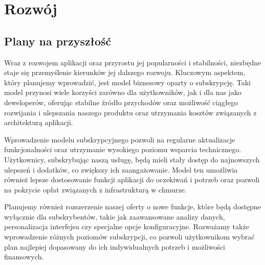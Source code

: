\section{Rozwój}

\subsection{Plany na przyszłość}
Wraz z rozwojem aplikacji oraz przyrostu jej popularności i stabilności, niezbędne staje się przemyślenie kierunków jej dalszego rozwoju. Kluczowym aspektem, który planujemy wprowadzić, jest model biznesowy oparty o subskrypcję. Taki model przynosi wiele korzyści zarówno dla użytkowników, jak i dla nas jako deweloperów, oferując stabilne źródło przychodów oraz możliwość ciągłego rozwijania i ulepszania naszego produktu oraz utrzymania kosztów związanych z architekturą aplikacji.

Wprowadzenie modelu subskrypcyjnego pozwoli na regularne aktualizacje funkcjonalności oraz utrzymanie wysokiego poziomu wsparcia technicznego. Użytkownicy, subskrybując naszą usługę, będą mieli stały dostęp do najnowszych ulepszeń i dodatków, co zwiększy ich zaangażowanie. Model ten umożliwia również lepsze dostosowanie funkcji aplikacji do oczekiwań i potrzeb oraz pozwoli na pokrycie opłat związanych z infrastrukturą w chmurze.

Planujemy również rozszerzenie naszej oferty o nowe funkcje, które będą dostępne wyłącznie dla subskrybentów, takie jak zaawansowane analizy danych, personalizacja interfejsu czy specjalne opcje konfiguracyjne. Rozważamy także wprowadzenie różnych poziomów subskrypcji, co pozwoli użytkownikom wybrać plan najlepiej dopasowany do ich indywidualnych potrzeb i możliwości finansowych.